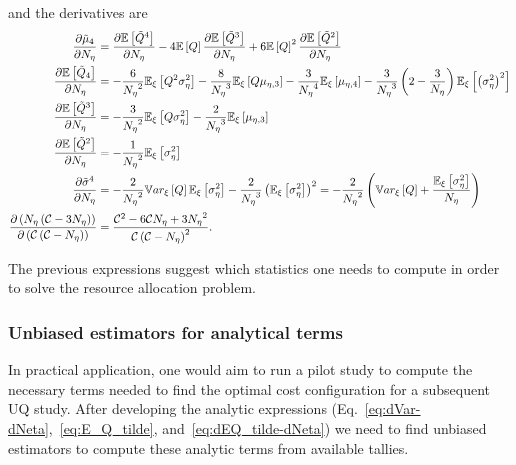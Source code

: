 and the derivatives are
\begin{equation}\label{eq:dEQ_tilde-dNeta}
 \begin{split}
  \frac{ \partial  \tilde{\mu}_4  }{ \partial  {N_\eta}  } &= \frac{ \partial  \mathbb{E}\left[\tilde{Q}^4\right]  }{ \partial  {N_\eta}  } - 4 \mathbb{E}\left[Q\right] \frac{ \partial  \mathbb{E}\left[\tilde{Q}^3\right]  }{ \partial  {N_\eta}  } + 6 \mathbb{E}\left[Q\right]^2 \frac{ \partial  \mathbb{E}\left[\tilde{Q}^2\right]  }{ \partial  {N_\eta}  } \\
  \frac{ \partial  \mathbb{E}\left[\tilde{Q}_4\right]  }{ \partial  {N_\eta}  } &= - \frac{6}{{N_\eta}^2} \mathbb{E}_\xi\left[ Q^2 \sigma^2_\eta \right] - \frac{ 8 }{ {N_\eta}^3 } \mathbb{E}_\xi\left[ Q \mu_{\eta,3} \right] - \frac{ 3 }{ {N_\eta}^4 } \mathbb{E}_\xi\left[ \mu_{\eta,4} \right] 
                                      - \frac{3}{{N_\eta}^3} \left( 2 - \frac{3}{{N_\eta}} \right) \mathbb{E}_\xi\left[ \left( \sigma^2_\eta \right)^2 \right] \\
  \frac{ \partial  \mathbb{E}\left[\tilde{Q}^3\right]  }{ \partial  {N_\eta}  } &= - \frac{ 3 }{ {N_\eta}^2 } \mathbb{E}_\xi\left[ Q \sigma^2_\eta \right] - \frac{ 2 }{ {N_\eta}^3 } \mathbb{E}_\xi\left[ \mu_{\eta,3} \right] \\  
  \frac{ \partial  \mathbb{E}\left[\tilde{Q}^2\right]  }{ \partial  {N_\eta}  } &= - \frac{1}{{N_\eta}^2} \mathbb{E}_\xi\left[ \sigma^2_\eta \right] \\
  \frac{ \partial  \tilde{\sigma}^4  }{ \partial  {N_\eta}  }      &= - \frac{2}{{N_\eta}^2} \mathbb{V}ar_\xi\left[Q\right] \mathbb{E}_\xi\left[\sigma^2_\eta\right] - \frac{2}{{N_\eta}^3} \left( \mathbb{E}_\xi\left[ \sigma^2_\eta \right] \right)^2 = - \frac{2}{{N_\eta}^2} \left( \mathbb{V}ar_\xi\left[Q\right] + \frac{ \mathbb{E}_\xi\left[\sigma^2_\eta\right] }{ {N_\eta} } \right)\\
  \frac{ \partial  \left({N_\eta} \left( \mathcal{C} - 3 {N_\eta} \right) \right)  }{ \partial  \left( \mathcal{C} \left( \mathcal{C} - {N_\eta} \right) \right)  } &= \frac{ \mathcal{C}^2 - 6 \mathcal{C} {N_\eta} + 3 {N_\eta}^2}{ \mathcal{C} \left( \mathcal{C} - {N_\eta} \right)^2 }.
 \end{split}
\end{equation}

\noindent The previous expressions suggest which statistics one needs to compute in order to solve the resource allocation problem.

\subsubsection{Unbiased estimators for analytical terms}
In practical application, one would aim to run a pilot study to compute the necessary terms needed to find the optimal cost configuration for a subsequent UQ study. After developing the analytic expressions (Eq.~\eqref{eq:dVar-dNeta},~\eqref{eq:E_Q_tilde}, and~\eqref{eq:dEQ_tilde-dNeta}) we need to find unbiased estimators to compute these analytic terms from available tallies.

